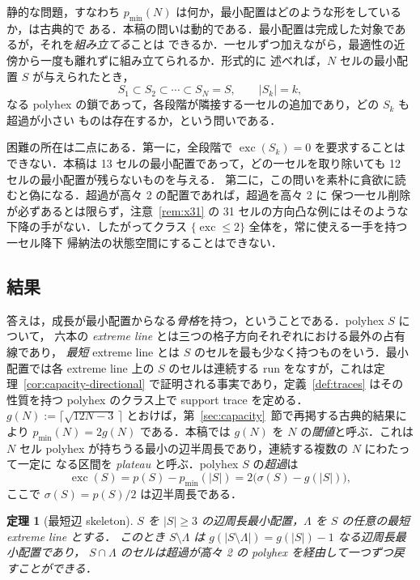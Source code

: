 \documentclass[11pt]{article}
\theoremstyle{plain}
\newtheorem{theorem}{定理}[section]
\theoremstyle{definition}
\theoremstyle{remark}
\newcommand{\sm}{\setminus}
\DeclareMathOperator{\exc}{exc}
\begin{document}
静的な問題，すなわち \(p_{\min}(N)\) は何か，最小配置はどのような形をしているか，は古典的で
ある．本稿の問いは動的である．最小配置は完成した対象であるが，それを\emph{組み立てる}ことは
できるか．一セルずつ加えながら，最適性の近傍から一度も離れずに組み立てられるか．形式的に
述べれば，\(N\) セルの最小配置 \(S\) が与えられたとき，
\[
   S_{1}\subset S_{2}\subset\cdots\subset S_{N}=S,\qquad |S_{k}|=k,
\]
なる polyhex の鎖であって，各段階が隣接する一セルの追加であり，どの \(S_{k}\) も超過が小さい
ものは存在するか，という問いである．

困難の所在は二点にある．第一に，全段階で \(\exc(S_{k})=0\) を要求することはできない．本稿は
13 セルの最小配置であって，どの一セルを取り除いても 12 セルの最小配置が残らないものを与える．
第二に，この問いを素朴に貪欲に読むと偽になる．超過が高々 2 の配置であれば，超過を高々 2 に
保つ一セル削除が必ずあるとは限らず，注意~\ref{rem:x31} の 31 セルの方向凸な例にはそのような
下降の手がない．したがってクラス \(\{\exc\le2\}\) 全体を，常に使える一手を持つ一セル降下
帰納法の状態空間にすることはできない．

\subsection{結果}\label{sec:0.2}

答えは，成長が最小配置からなる\emph{骨格}を持つ，ということである．polyhex \(S\) について，
六本の \emph{extreme line} とは三つの格子方向それぞれにおける最外の占有線であり，
\emph{最短} extreme line とは \(S\) のセルを最も少なく持つものをいう．最小配置では各
extreme line 上の \(S\) のセルは連続する run をなすが，これは定理~\ref{cor:capacity-directional}
で証明される事実であり，定義~\ref{def:traces} はその性質を持つ polyhex のクラス上で
support trace を定める．
\(g(N):=\lceil\sqrt{12N-3}\,\rceil\) とおけば，第~\ref{sec:capacity}~節で再掲する古典的結果により
\(p_{\min}(N)=2g(N)\) である．本稿では \(g(N)\) を \(N\) の\emph{閾値}と呼ぶ．これは
\(N\) セル polyhex が持ちうる最小の辺半周長であり，連続する複数の \(N\) にわたって一定に
なる区間を \emph{plateau} と呼ぶ．polyhex \(S\) の\emph{超過}は
\[
  \exc(S)=p(S)-p_{\min}(|S|)=2\bigl(\sigma(S)-g(|S|)\bigr),
\]
ここで \(\sigma(S)=p(S)/2\) は辺半周長である．

\begin{theorem}[最短辺 skeleton]\label{thm:intro-skel}
\(S\) を \(|S|\ge3\) の辺周長最小配置，\(\Lambda\) を \(S\) の任意の最短 extreme line とする．
このとき \(S\sm\Lambda\) は \(g(|S\sm\Lambda|)=g(|S|)-1\) なる辺周長最小配置であり，
\(S\cap\Lambda\) のセルは超過が高々 2 の polyhex を経由して一つずつ戻すことができる．
\end{theorem}
\end{document}
